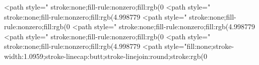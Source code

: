 <path style=" stroke:none;fill-rule:nonzero;fill:rgb(0%
<path style=" stroke:none;fill-rule:nonzero;fill:rgb(4.998779%
<path style=" stroke:none;fill-rule:nonzero;fill:rgb(0%
<path style=" stroke:none;fill-rule:nonzero;fill:rgb(4.998779%
<path style=" stroke:none;fill-rule:nonzero;fill:rgb(0%
<path style=" stroke:none;fill-rule:nonzero;fill:rgb(4.998779%
<path style="fill:none;stroke-width:1.0959;stroke-linecap:butt;stroke-linejoin:round;stroke:rgb(0%
